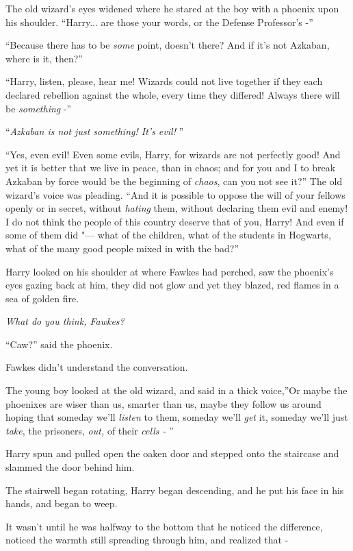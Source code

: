 The old wizard's eyes widened where he stared at the boy with a phoenix
upon his shoulder. ``Harry... are those your words, or the Defense
Professor's -''

``Because there has to be \emph{some} point, doesn't there? And if it's
not Azkaban, where is it, then?''

``Harry, listen, please, hear me! Wizards could not live together if they
each declared rebellion against the whole, every time they differed!
Always there will be \emph{something} -''

``\emph{Azkaban is not just something! It's evil!} ''

``Yes, even evil! Even some evils, Harry, for wizards are not perfectly
good! And yet it is better that we live in peace, than in chaos; and for
you and I to break Azkaban by force would be the beginning of
\emph{chaos}, can you not see it?'' The old wizard's voice was pleading.
``And it is possible to oppose the will of your fellows openly or in
secret, without \emph{hating} them, without declaring them evil and
enemy! I do not think the people of this country deserve that of you,
Harry! And even if some of them did "--- what of the children, what of the
students in Hogwarts, what of the many good people mixed in with the
bad?''

Harry looked on his shoulder at where Fawkes had perched, saw the
phoenix's eyes gazing back at him, they did not glow and yet they
blazed, red flames in a sea of golden fire.

\emph{What do you think, Fawkes?}

``Caw?'' said the phoenix.

Fawkes didn't understand the conversation.

The young boy looked at the old wizard, and said in a thick voice,''Or
maybe the phoenixes are wiser than us, smarter than us, maybe they
follow us around hoping that someday we'll \emph{listen} to them,
someday we'll \emph{get} it, someday we'll just \emph{take}, the
prisoners, \emph{out,} of their \emph{cells -} ''

Harry spun and pulled open the oaken door and stepped onto the staircase
and slammed the door behind him.

The stairwell began rotating, Harry began descending, and he put his
face in his hands, and began to weep.

It wasn't until he was halfway to the bottom that he noticed the
difference, noticed the warmth still spreading through him, and realized
that -

